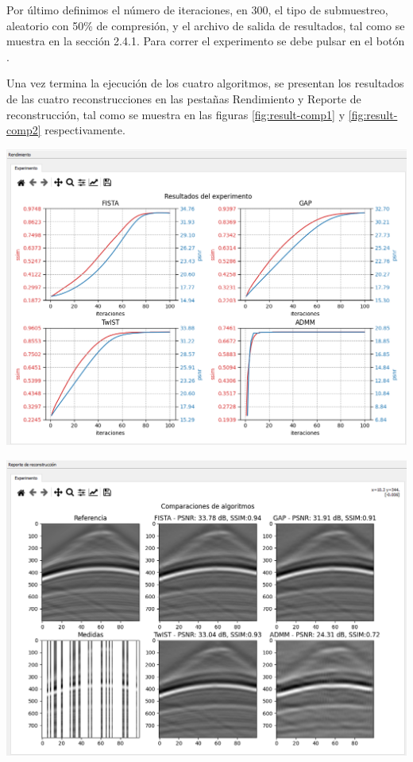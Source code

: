 \documentclass[12pt,twoside,letter]{ol-softwaremanual}
\newenvironment{Figure}
  {\par\medskip\noindent\minipage{\linewidth}}
  {\endminipage\par\medskip}
\begin{document}
Por último definimos el número de iteraciones, en 300, el tipo de submuestreo, aleatorio con 50\% de compresión, y el archivo de salida de resultados, tal como se muestra en la sección 2.4.1. Para correr el experimento se debe pulsar en el botón \hspace{0.5mm} \faPlay \hspace{0.5mm}.

Una vez termina la ejecución de los cuatro algoritmos, se presentan los resultados de las cuatro reconstrucciones en las pestañas Rendimiento y Reporte de reconstrucción, tal como se muestra en las figuras \ref{fig:result-comp1} y \ref{fig:result-comp2} respectivamente.

\begin{Figure}
	\centering
	\includegraphics[width=0.8\linewidth]{result-comp1.png}
	\label{fig:result-comp1}
\end{Figure}

\begin{Figure}
	\centering
	\includegraphics[width=0.8\linewidth]{result-comp2.png}
	\label{fig:result-comp2}
\end{Figure}
\end{document}
